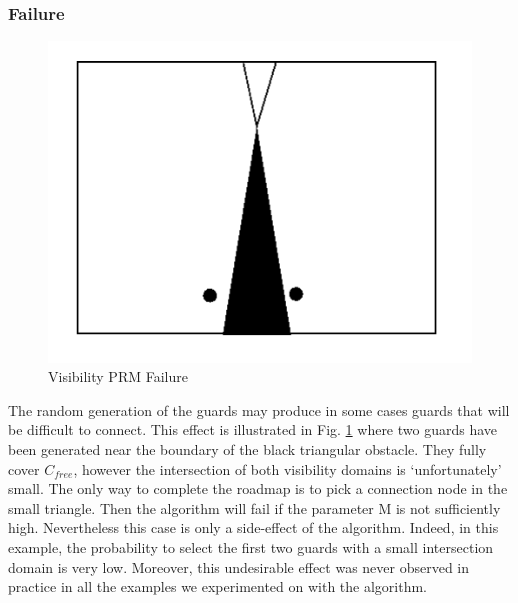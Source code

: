 \documentclass[11pt]{article}
\begin{document}
\subsubsection{Failure}
\begin{figure}[h]
\includegraphics{visibility_prm_failure}
\centering
\caption{Visibility PRM Failure}
\label{fig:visprm_failure}
\end{figure}
The random generation of the guards may produce in some cases guards that will
be difficult to connect. This effect is illustrated in Fig. \ref{fig:visprm_failure} where two guards have
been generated near the boundary of the black triangular obstacle. They fully cover
$C_{free}$, however the intersection of both visibility domains is ‘unfortunately’ small.
The only way to complete the roadmap is to pick a connection node in the small
triangle. Then the algorithm will fail if the parameter M is not sufficiently high. Nevertheless this case is only a side-effect of the algorithm. Indeed, in this example,
the probability to select the first two guards with a small intersection domain is very
low. Moreover, this undesirable effect was never observed in practice in all the
examples we experimented on with the algorithm.
\end{document}

